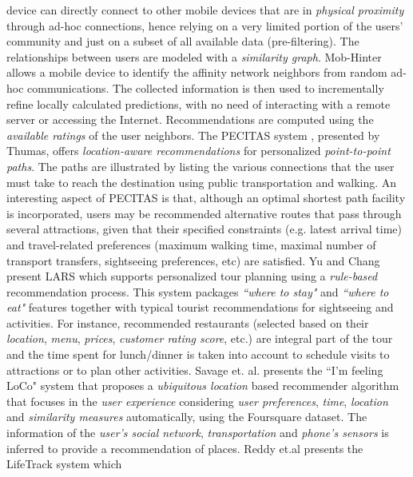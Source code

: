 device can directly connect to other mobile devices that are in 
\textit{physical proximity} through ad-hoc connections, hence 
relying on a very limited portion of the users' community and just 
on a subset of all available data (pre-filtering). The relationships 
between users are modeled with a \textit{similarity graph}. Mob-Hinter 
allows a mobile device to identify the affinity network neighbors 
from random ad-hoc communications. The collected information 
is then used to incrementally refine locally
calculated predictions, with no need of interacting with a remote
server or accessing the Internet. Recommendations are computed
using the \textit{available ratings} of the user neighbors.
The PECITAS system \cite{tumas2009personalized}, presented by Thumas, 
offers \textit{location-aware recommendations} for personalized 
\textit{point-to-point paths}. The paths are illustrated by listing 
the various connections that the user must take to reach the 
destination using public transportation and walking. An
interesting aspect of PECITAS is that, although an optimal shortest 
path facility is incorporated, users may be recommended alternative 
routes that pass through several attractions, given that
their specified constraints (e.g. latest arrival time) and travel-related 
preferences (maximum walking time, maximal number of transport
transfers, sightseeing preferences, etc) are satisfied. 
Yu and Chang present LARS \cite{yu2009personalized} 
which supports personalized tour planning using a \textit{rule-based} 
recommendation process. This system
packages \textit{``where to stay"} and \textit{``where to eat"} 
features together with typical tourist recommendations 
for sightseeing and activities. For
instance, recommended restaurants (selected based on their 
\textit{location}, \textit{menu},  \textit{prices}, \textit{customer rating score}, 
etc.) are integral part of the tour and the time spent for 
lunch/dinner is taken into account to schedule visits to 
attractions or to plan other activities.
Savage et. al. presents the ``I'm feeling LoCo" system \cite{savage2012m}
that proposes a \textit{ubiquitous location­} based recommender algorithm
that focuses in the \textit{user experience} considering 
\textit{user preferences}, \textit{time}, \textit{location} and 
\textit{similarity measures} automatically, using the Foursquare
dataset. The information of the \textit{user's social network},
\textit{transportation} and \textit{phone's sensors} is inferred to provide
a recommendation of places.
Reddy et.al\cite{reddy2006lifetrak} presents the LifeTrack system which 
